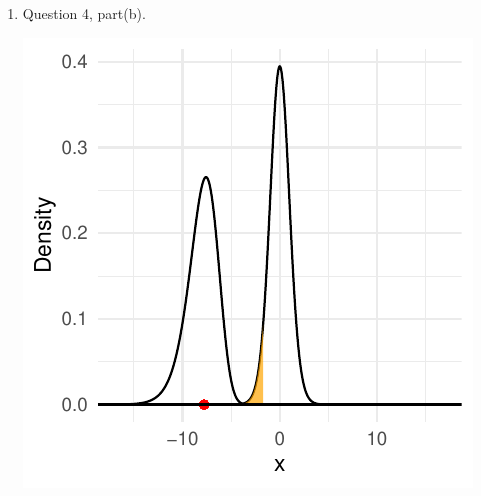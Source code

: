 \documentclass{article}\usepackage[]{graphicx}\usepackage[]{xcolor}
\makeatletter
\def\maxwidth{ %
  \ifdim\Gin@nat@width>\linewidth
    \linewidth
  \else
    \Gin@nat@width
  \fi
}
\newenvironment{knitrout}{}{} %
\makeatother
\begin{document}
\begin{enumerate}
\begin{enumerate}
  \item Question 4, part(b).

\begin{center}
\begin{knitrout}
\color{fgcolor}
\includegraphics[width=\maxwidth]{figure/unnamed-chunk-11-1} 
\end{knitrout}
\end{center}


\end{enumerate}
\end{enumerate}
\end{document}
